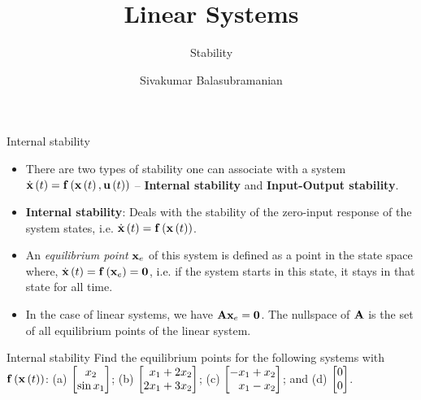 \documentclass[aspectratio=169]{beamer}
\title{Linear Systems}
\subtitle{Stability}
\author{Sivakumar Balasubramanian}
\institute[Christian Medical College] %
{
  \inst{}%
  Department of Bioengineering\\
  Christian Medical College, Bagayam\\
  Vellore 632002
}
\date{}
\def\mf{\ensuremath\mathbf}
\def\lp{\ensuremath\left(}
\def\rp{\ensuremath\right)}
\def\bmx{\ensuremath\begin{bmatrix*}[r]}
\def\emx{\ensuremath\end{bmatrix*}}
\def\bmxc{\ensuremath\begin{bmatrix*}[c]}
\newcommand{\ct}[1]{\lp #1\rp}
\begin{document}

\begin{frame}
  \titlepage
\end{frame}


\begin{frame}[t]{Internal stability}
\begin{itemize}
    \item There are two types of stability one can associate with a system $\dot{\mf{x}}\ct{t} = \mf{f}\ct{\mf{x}\ct{t}, \mf{u}\ct{t}}$ -- \textbf{Internal stability} and \textbf{Input-Output stability}.

    \item \textbf{Internal stability}: Deals with the stability of the zero-input response of the system states, i.e. $\dot{\mf{x}}\ct{t} = \mf{f}\ct{\mf{x}\ct{t}}$.

    \item An \textit{equilibrium point} $\mf{x}_e$ of this system is defined as a point in the state space where, $\dot{\mf{x}}\ct{t} = \mf{f}\ct{\mf{x}_e} = \mf{0}$, i.e. if the system starts in this state, it stays in that state for all time.

    \item In the case of linear systems, we have $\mf{A}\mf{x}_e = \mf{0}$. The nullspace of $\mf{A}$ is the set of all equilibrium points of the linear system.
\end{itemize}
\end{frame}


\begin{frame}[t]{Internal stability}
Find the equilibrium points for the following systems with $\mf{f}\ct{\mf{x}\ct{t}}$: (a) $\bmxc x_2 \\ \sin x_1\emx$; (b) $\bmx x_1 + 2x_2\\ 2x_1 + 3x_2\emx$; (c) $\bmx -x_1 + x_2\\ x_1 - x_2\emx$; and (d) $\bmx 0 \\ 0\emx$.
\end{frame}
\end{document}
